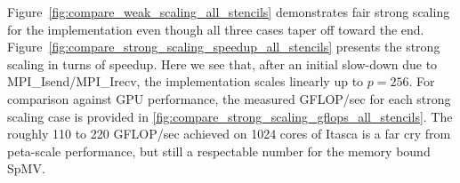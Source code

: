 \documentclass{report}
\begin{document}
Figure~\ref{fig:compare_weak_scaling_all_stencils} demonstrates fair strong scaling for the implementation even though all three cases taper off toward the end. Figure~\ref{fig:compare_strong_scaling_speedup_all_stencils} presents the strong scaling in turns of speedup. Here we see that, after an initial slow-down due to MPI\_Isend/MPI\_Irecv, the implementation scales linearly up to $p=256$. For comparison against GPU performance, the measured GFLOP/sec for each strong scaling case is provided in \ref{fig:compare_strong_scaling_gflops_all_stencils}. The roughly 110 to 220 GFLOP/sec achieved on 1024 cores of Itasca is a far cry from peta-scale performance, but still a respectable number for the memory bound SpMV. 



%
\end{document}
